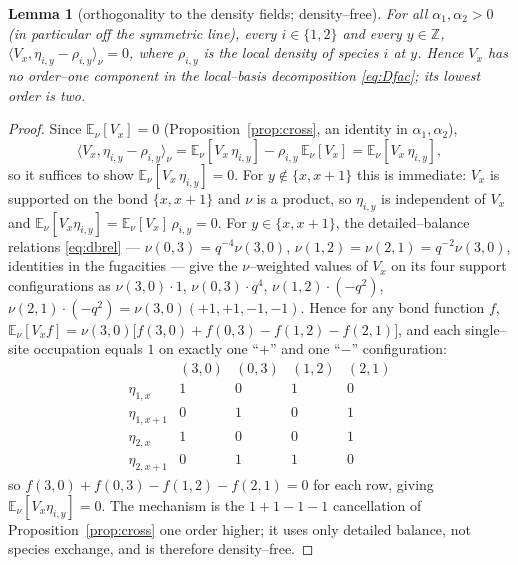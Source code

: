 \documentclass[11pt]{article}
\theoremstyle{plain}
\newtheorem{lemma}[theorem]{Lemma}
\theoremstyle{definition}
\theoremstyle{remark}
\newcommand{\Z}{\mathbb{Z}}\newcommand{\R}{\mathbb{R}}\newcommand{\N}{\mathbb{N}}
\newcommand{\E}{\mathbb{E}}\newcommand{\PP}{\mathbb{P}}\newcommand{\dd}{\,\mathrm{d}}
\newcommand{\ip}[2]{\langle #1,#2\rangle_\nu}\newcommand{\bone}{\mathbf 1}
\begin{document}
\begin{lemma}[orthogonality to the density fields; density--free]\label{lem:orth}
For all $\alpha_1,\alpha_2>0$ (in particular off the symmetric line), every
$i\in\{1,2\}$ and every $y\in\Z$, $\ip{V_x}{\eta_{i,y}-\rho_{i,y}}=0$, where
$\rho_{i,y}$ is the local density of species $i$ at $y$. Hence $V_x$ has no order--one
component in the local--basis decomposition \eqref{eq:Dfac}; its lowest order is two.
\end{lemma}
\begin{proof}
Since $\E_\nu[V_x]=0$ (Proposition~\ref{prop:cross}, an identity in $\alpha_1,\alpha_2$),
\[
  \ip{V_x}{\eta_{i,y}-\rho_{i,y}}=\E_\nu[V_x\,\eta_{i,y}]-\rho_{i,y}\,\E_\nu[V_x]
  =\E_\nu[V_x\,\eta_{i,y}],
\]
so it suffices to show $\E_\nu[V_x\,\eta_{i,y}]=0$. For $y\notin\{x,x+1\}$ this is
immediate: $V_x$ is supported on the bond $\{x,x+1\}$ and $\nu$ is a product, so
$\eta_{i,y}$ is independent of $V_x$ and $\E_\nu[V_x\eta_{i,y}]=\E_\nu[V_x]\,\rho_{i,y}=0$.
For $y\in\{x,x+1\}$, the detailed--balance relations \eqref{eq:dbrel} ---
$\nu(0,3)=q^{-4}\nu(3,0)$, $\nu(1,2)=\nu(2,1)=q^{-2}\nu(3,0)$, identities in the
fugacities --- give the $\nu$--weighted values of $V_x$ on its four support
configurations as $\nu(3,0)\cdot1$, $\nu(0,3)\cdot q^4$, $\nu(1,2)\cdot(-q^2)$,
$\nu(2,1)\cdot(-q^2)=\nu(3,0)(+1,+1,-1,-1)$. Hence for any bond function $f$,
$\E_\nu[V_x f]=\nu(3,0)\big[f(3,0)+f(0,3)-f(1,2)-f(2,1)\big]$, and each single--site
occupation equals $1$ on exactly one ``$+$'' and one ``$-$'' configuration:
\[
  \begin{array}{c|cccc}
   & (3,0) & (0,3) & (1,2) & (2,1)\\\hline
   \eta_{1,x}   & 1 & 0 & 1 & 0\\
   \eta_{1,x+1} & 0 & 1 & 0 & 1\\
   \eta_{2,x}   & 1 & 0 & 0 & 1\\
   \eta_{2,x+1} & 0 & 1 & 1 & 0
  \end{array}
\]
so $f(3,0)+f(0,3)-f(1,2)-f(2,1)=0$ for each row, giving $\E_\nu[V_x\eta_{i,y}]=0$. The
mechanism is the $1+1-1-1$ cancellation of Proposition~\ref{prop:cross} one order
higher; it uses only detailed balance, not species exchange, and is therefore
density--free.


\end{proof}
\end{document}
